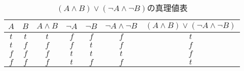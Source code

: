 \documentclass[11pt,dvipdfmx]{jreport}
\begin{document}
\begin{table}[!htbp]
  \centering
  \caption{$(A \land B) \lor (\lnot A \land \lnot B)$の真理値表}
  \vspace{3mm}
  \begin{tabular}{c|c|c|c|c|c|c}
    $A$ & $B$ & $A \land B$ & $\lnot A$ & $\lnot B$ & $\lnot A \land \lnot B$ & $(A \land B) \lor (\lnot A \land \lnot B)$
    \\ \hline
    $t$ & $t$ & $t$ & $f$ & $f$ & $f$ & $t$ \\ \hline
    $t$ & $f$ & $f$ & $f$ & $t$ & $f$ & $f$ \\ \hline
    $f$ & $f$ & $f$ & $t$ & $t$ & $t$ & $f$ \\ \hline
    $f$ & $f$ & $f$ & $t$ & $f$ & $f$ & $t$ \\ 
  \end{tabular}
  \label{tb:equiv2}
\end{table}

\par
\vspace{5mm}
\end{document}
